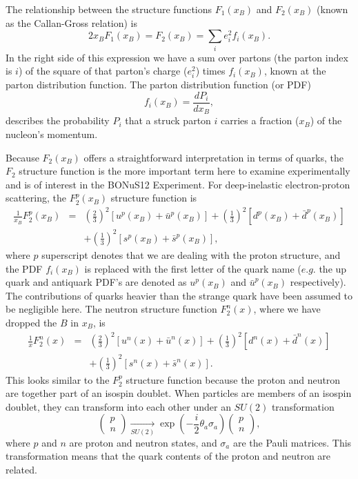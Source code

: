 The relationship between the structure functions $F_1(x_B)$ and $F_2(x_B)$ (known as the Callan-Gross relation) is
\begin{equation}
2x_B F_1(x_B) = F_2(x_B) = \sum_i e_i^2 f_i (x_B). 
\end{equation} 
In the right side of this expression we have a sum over partons (the parton index is $i$) of the square of that parton's charge ($e_i^2$) times $f_i(x_B)$, known at the parton distribution function. The parton distribution function (or PDF) 
\begin{equation}
f_i(x_B) = \frac{dP_i}{dx_B},
\end{equation}
describes the probability $P_i$ that a struck parton $i$ carries a fraction ($x_B$) of the nucleon's momentum.

Because $F_2(x_B)$ offers a straightforward interpretation in terms of quarks, the $F_2$ structure function is the more important term here to examine experimentally and is of interest in the BONuS12 Experiment. For deep-inelastic electron-proton scattering, the $F_2^p(x_B)$ structure function is
\begin{eqnarray}
\label{eqn:F_p}
\frac{1}{x_B} F_2^p(x_B) &=& \left( \frac{2}{3} \right)^2 [u^p(x_B)+\bar{u}^p(x_B)] + \left( \frac{1}{3} \right)^2 [d^p(x_B)+\bar{d}^p(x_B)] \\
&& + \left( \frac{1}{3} \right)^2 [s^p(x_B)+\bar{s}^p(x_B)],
\end{eqnarray}
where $p$ superscript denotes that we are dealing with the proton structure, and the PDF $f_i(x_B)$ is replaced with the first letter of the quark name ($e.g.$ the up quark and antiquark PDF's are denoted as $u^p(x_B)$ and $\bar{u}^p(x_B)$ respectively). The contributions of quarks heavier than the strange quark have been assumed to be negligible here. The neutron structure function $F_2^n(x)$, where we have dropped the $B$ in $x_B$, is
\begin{eqnarray}
\label{eqn:F_n}
\frac{1}{x} F_2^n(x) &=& \left( \frac{2}{3} \right)^2 [u^n(x)+\bar{u}^n(x)] + \left( \frac{1}{3} \right)^2 [d^n(x)+\bar{d}^n(x)] \\
&& + \left( \frac{1}{3} \right)^2 [s^n(x)+\bar{s}^n(x)].
\end{eqnarray}
This looks similar to the $F_2^p$ structure function because the proton and neutron are together part of an isospin doublet. When particles are members of an isospin doublet, they can transform into each other under an $SU(2)$ transformation
\begin{equation*}
\begin{pmatrix}
p \\ n 
\end{pmatrix}
\xrightarrow[\text{$SU(2)$}]{}
\exp \left( -\frac{i}{2}\theta_a \sigma_a \right)
\begin{pmatrix}
p \\ n
\end{pmatrix},
\end{equation*}
where $p$ and $n$ are proton and neutron states, and $\sigma_a$ are the Pauli matrices. This transformation means that the quark contents of the proton and neutron are related.

